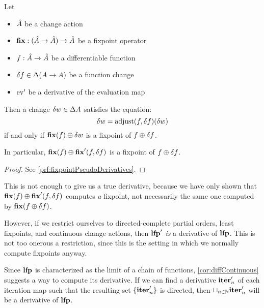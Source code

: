 \begin{thm}[name=Pseudo-derivatives of fixpoints, restate=fixpointPseudoDerivatives]
\label{thm:fixpointPseudoDerivatives}
  Let
  \begin{itemize}
    \item $\hat{A}$ be a change action
    \item $\textbf{fix} : (\hat{A} \rightarrow \hat{A}) \rightarrow \hat{A}$ be a fixpoint operator
    \item $f: \hat{A} \rightarrow \hat{A}$ be a differentiable function
    \item $\delta f \in \Delta (A \rightarrow A)$ be a function change 
    \item $\operatorname{ev}'$ be a derivative of the evaluation map
  \end{itemize}

  Then a change $\delta w \in \Delta A$ satisfies
  the equation:
  \begin{equation}\label{eqn:fixcondition}
    \delta w = \operatorname{adjust}(f, \delta f)(\delta w)
  \end{equation}
  if and only if $\textbf{fix}(f) \oplus \delta w$ is a fixpoint of $f \oplus \delta f$.

  In particular, $\textbf{fix}(f) \oplus \textbf{fix}'(f, \delta f)$ is a fixpoint
  of $f \oplus \delta f$.
\end{thm}
\ifproofs
\begin{proof}
  See \cref{prf:fixpointPseudoDerivatives}.
\end{proof}
\fi

This is not enough to give us a true derivative, because we have only shown
that $\textbf{fix}(f) \oplus \textbf{fix}'(f, \delta f)$ computes \emph{a} fixpoint, not necessarily
the same one computed by $\textbf{fix}{(f \oplus\delta f)}$.

However, if we restrict ourselves to directed-complete partial orders, least
fixpoints, and continuous change actions, then $\textbf{lfp}'$ \emph{is} a
derivative of $\textbf{lfp}$. This is not too onerous a restriction, since this is
the setting in which we normally compute fixpoints anyway.

Since $\textbf{lfp}$ is characterized as the limit of a chain of functions,
\cref{cor:diffContinuous} suggests a way to compute its derivative. If we can find a derivative
$\textbf{iter}_n'$ of each iteration map 
such that the resulting set $\{ \textbf{iter}_n' \}$ is directed, then $\sqcup_{n \in \mathbb{N}}\textbf{iter}_n'$ will be a derivative of $\textbf{lfp}$.

